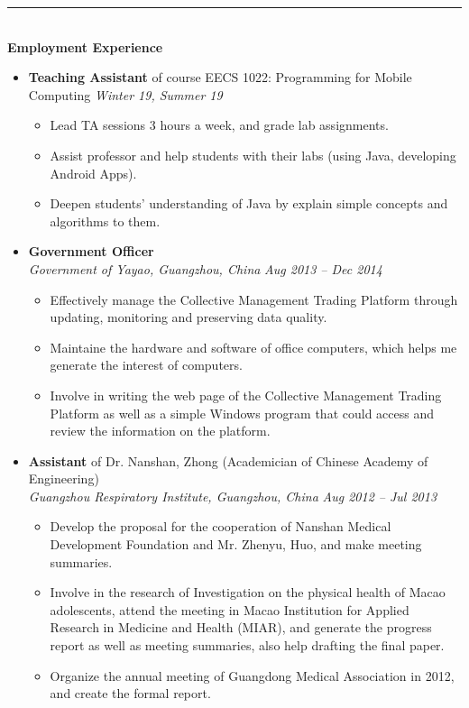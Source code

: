 \documentclass[a4paper,10pt,titlepage]{article}
\begin{document}
\rule{\linewidth}{0.1mm}
~\\
\textbf {\Large Employment Experience}
\begin{itemize}%
	\item {\bf Teaching Assistant} of course EECS 1022: Programming for Mobile Computing {\hfill \emph {Winter 19, Summer 19}}
	\begin{itemize}%
		\item Lead TA sessions 3 hours a week, and grade lab assignments.
		\item Assist professor and help students with their labs (using Java, developing Android Apps).
		\item Deepen students' understanding of Java by explain simple concepts and algorithms to them.
	\end{itemize}
	\item {\bf Government Officer}
	\\\emph {Government of Yayao, Guangzhou, China} {\hfill \emph{Aug 2013 – Dec 2014}}
	\begin{itemize}%
	\item Effectively manage the Collective Management Trading Platform through updating, monitoring and preserving data quality.
	\item Maintaine the hardware and software of office computers, which helps me generate the interest of computers.
	\item Involve in writing the web page of the Collective Management Trading Platform as well as a simple Windows program that could access and review the information on the platform.
	\end{itemize}
	\item {\bf Assistant} of Dr. Nanshan, Zhong (Academician of Chinese	Academy of Engineering)
	\\\emph {Guangzhou Respiratory Institute, Guangzhou, China} {\hfill \emph{Aug 2012 – Jul 2013}}
	\begin{itemize}%
	\item Develop the proposal for the cooperation of Nanshan Medical Development Foundation and Mr. Zhenyu, Huo, and make meeting summaries.
	\item Involve in the research of Investigation on the physical health of Macao adolescents, attend the meeting in Macao Institution for Applied Research in Medicine and Health (MIAR), and generate the progress report as well as meeting summaries, also help drafting the final paper.
	\item Organize the annual meeting of Guangdong Medical Association in 2012, and create the  formal report.
	\end{itemize}
\end{itemize}
\end{document}
